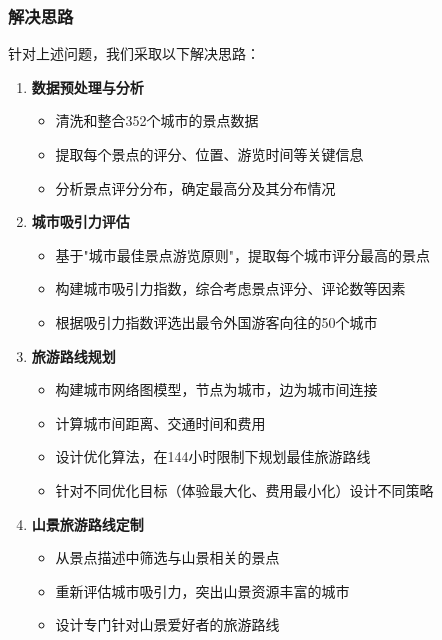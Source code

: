 \documentclass[withoutpreface,bwprint]{cumcmthesis} %
\begin{document}
\subsubsection{解决思路}

针对上述问题，我们采取以下解决思路：

\begin{enumerate}
    \item \textbf{数据预处理与分析}
    \begin{itemize}
        \item 清洗和整合352个城市的景点数据
        \item 提取每个景点的评分、位置、游览时间等关键信息
        \item 分析景点评分分布，确定最高分及其分布情况
    \end{itemize}
    
    \item \textbf{城市吸引力评估}
    \begin{itemize}
        \item 基于"城市最佳景点游览原则"，提取每个城市评分最高的景点
        \item 构建城市吸引力指数，综合考虑景点评分、评论数等因素
        \item 根据吸引力指数评选出最令外国游客向往的50个城市
    \end{itemize}
    
    \item \textbf{旅游路线规划}
    \begin{itemize}
        \item 构建城市网络图模型，节点为城市，边为城市间连接
        \item 计算城市间距离、交通时间和费用
        \item 设计优化算法，在144小时限制下规划最佳旅游路线
        \item 针对不同优化目标（体验最大化、费用最小化）设计不同策略
    \end{itemize}
    
    \item \textbf{山景旅游路线定制}
    \begin{itemize}
        \item 从景点描述中筛选与山景相关的景点
        \item 重新评估城市吸引力，突出山景资源丰富的城市
        \item 设计专门针对山景爱好者的旅游路线
    \end{itemize}
\end{enumerate}
\end{document}
